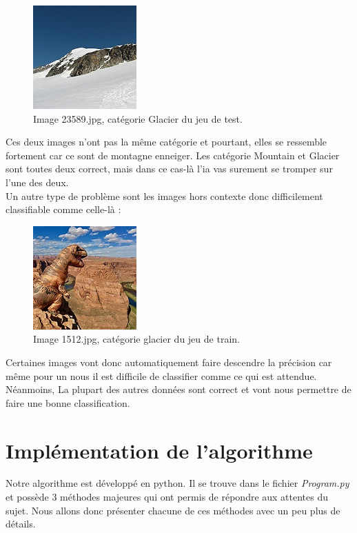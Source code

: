 \documentclass[12pt ,a4paper ]{article}
\begin{document}
\begin{multicols}{2}
\begin{figure}[H]
\begin{center}
\includegraphics[scale=1]{./img/23589.jpg}
\caption{\small{Image 23589.jpg, catégorie Glacier du jeu de test.}}
\end{center}
\end{figure}
Ces deux images n’ont pas la même catégorie et pourtant, elles se ressemble fortement car ce sont de montagne enneiger. Les catégorie Mountain et Glacier sont toutes deux correct, mais dans ce cas-là l’ia vas surement se tromper sur l’une des deux.\\
Un autre type de problème sont les images hors contexte donc difficilement classifiable comme celle-là :
 
\begin{figure}[H]
\begin{center}
\includegraphics[scale=1]{./img/1512.jpg}
\caption{\small{Image 1512.jpg, catégorie glacier du jeu de train.}}
\end{center}
\end{figure}
Certaines images vont donc automatiquement faire descendre la précision car même pour un nous il est difficile de classifier comme ce qui est attendue. Néanmoins, La plupart des autres données sont correct et vont nous permettre de faire une bonne classification.

\newpage
\section{Implémentation de l'algorithme}
Notre algorithme est développé en python. Il se trouve dans le fichier \textit{Program.py} et possède 3 méthodes majeures qui ont permis de répondre aux attentes du sujet. Nous allons donc présenter chacune de ces méthodes avec un peu plus de détails. \\


\end{multicols}
\end{document}
